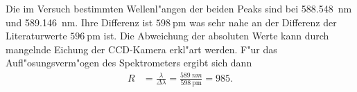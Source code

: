Die im Versuch bestimmten Wellenl"angen der beiden Peaks sind bei \SI{588.548}{nm} und \SI{589.146}{nm}.
Ihre Differenz ist $\SI{598}{\pico\metre}$ was sehr nahe an der Differenz der Literaturwerte $\SI{596}{\pico\metre}$ ist.
Die Abweichung der absoluten Werte kann durch mangelnde Eichung der CCD-Kamera erkl"art werden.
F"ur das Aufl"osungsverm"ogen des Spektrometers ergibt sich dann
\begin{align*}
R
    &=\frac{\lambda}{\Delta \lambda}
    =\frac{\SI{589}{nm}}{\SI{598}{\pico\metre}}
    =985.
\end{align*}
